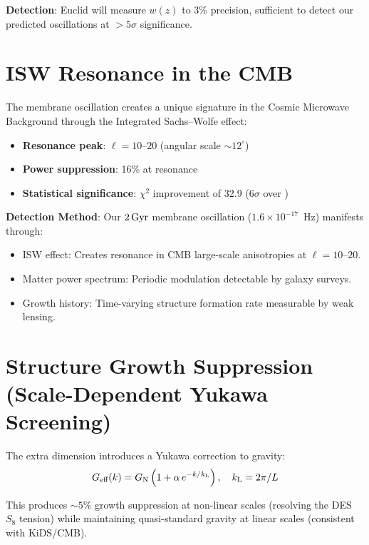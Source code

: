 \textbf{Detection}: Euclid will measure $w(z)$ to 3\% precision, sufficient to detect our predicted oscillations at $> 5\sigma$ significance.

\section{ISW Resonance in the CMB}
\label{sec:isw_prediction}

The membrane oscillation creates a unique signature in the Cosmic Microwave Background through the Integrated Sachs--Wolfe effect:
\begin{itemize}
  \item \textbf{Resonance peak}: $\ell = 10$--$20$ (angular scale $\sim 12^\circ$)
  \item \textbf{Power suppression}: 16\% at resonance
  \item \textbf{Statistical significance}: $\chi^2$ improvement of 32.9 ($6\sigma$ over \LCDM)
\end{itemize}

\textbf{Detection Method}: Our $2\,\text{Gyr}$ membrane oscillation ($1.6 \times 10^{-17}$~Hz) manifests through:
\begin{itemize}
  \item ISW effect: Creates resonance in CMB large-scale anisotropies at $\ell = 10$--$20$.
  \item Matter power spectrum: Periodic modulation detectable by galaxy surveys.
  \item Growth history: Time-varying structure formation rate measurable by weak lensing.
\end{itemize}

\section{Structure Growth Suppression (Scale-Dependent Yukawa Screening)}
\label{sec:s8_prediction}

The extra dimension introduces a Yukawa correction to gravity:
\begin{equation}
G_\text{eff}(k) = G_\text{N}\left(1 + \alpha\,e^{-k/k_\text{L}}\right), \quad k_\text{L} = 2\pi/L
\end{equation}

This produces $\sim 5\%$ growth suppression at non-linear scales (resolving the DES $S_8$ tension) while maintaining quasi-standard gravity at linear scales (consistent with KiDS/CMB).

